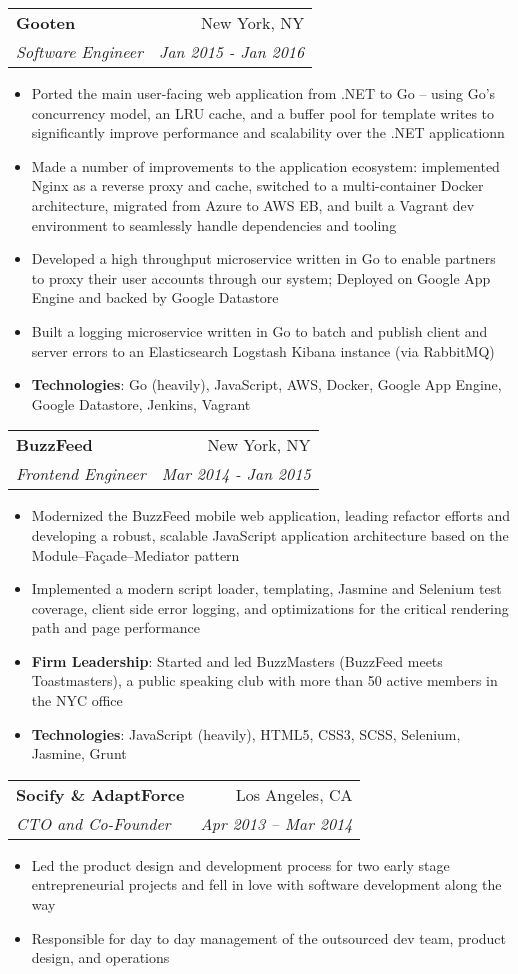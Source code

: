 \documentclass[letterpaper,11pt]{article}
\makeatletter
\newcommand{\resumeItem}[2]{
  \item\small{
    \textbf{#1}{: #2 \vspace{-2pt}}
  }
}
\newcommand{\resumeItemSimple}[1]{
  \item\small{
    {#1 \vspace{-2pt}}
  }
}
\newcommand{\resumeSubheading}[4]{
  \vspace{-1pt}\item
    \begin{tabular*}{0.97\textwidth}[t]{l@{\extracolsep{\fill}}r}
      \textbf{#1} & #2 \\
      \textit{\small#3} & \textit{\small #4} \\
    \end{tabular*}\vspace{-5pt}
}
\newcommand{\resumeItemListStart}{\begin{itemize}}
\newcommand{\resumeItemListEnd}{\end{itemize}\vspace{-5pt}}
\makeatother
\begin{document}
    \resumeSubheading
      {Gooten}{New York, NY}
      {Software Engineer}{Jan 2015 - Jan 2016}
      \resumeItemListStart
        \resumeItemSimple
          {Ported the main user-facing web application from .NET to Go -- using Go’s concurrency model, an LRU cache, and a buffer pool for template writes to significantly improve performance and scalability over the .NET applicationn}
        \resumeItemSimple
          {Made a number of improvements to the application ecosystem: implemented Nginx as a reverse proxy and cache, switched to a multi-container Docker architecture, migrated from Azure to AWS EB, and built a Vagrant dev environment to seamlessly handle dependencies and tooling}
        \resumeItemSimple
          {Developed a high throughput microservice written in Go to enable partners to proxy their user accounts through our system; Deployed on Google App Engine and backed by Google Datastore}
        \resumeItemSimple
          {Built a logging microservice written in Go to batch and publish client and server errors to an Elasticsearch Logstash Kibana instance (via RabbitMQ)}
        \resumeItem{Technologies}
        {Go (heavily), JavaScript, AWS, Docker, Google App Engine, Google Datastore, Jenkins, Vagrant}
      \resumeItemListEnd

    \resumeSubheading
      {BuzzFeed}{New York, NY}
      {Frontend Engineer}{Mar 2014 - Jan 2015}
      \resumeItemListStart
        \resumeItemSimple
          {Modernized the BuzzFeed mobile web application, leading refactor efforts and developing a robust, scalable JavaScript application architecture based on the Module–Fa\c cade–Mediator pattern}
        \resumeItemSimple
          {Implemented a modern script loader, templating, Jasmine and Selenium test coverage, client side error logging, and optimizations for the critical rendering path and page performance}
        \resumeItem{Firm Leadership}
          {Started and led BuzzMasters (BuzzFeed meets Toastmasters), a public speaking club with more than 50 active members in the NYC office}
        \resumeItem{Technologies}
        {JavaScript (heavily), HTML5, CSS3, SCSS, Selenium, Jasmine, Grunt}
      \resumeItemListEnd
      
    \resumeSubheading
      {Socify \& AdaptForce}{Los Angeles, CA}
      {CTO and Co-Founder}{Apr 2013 – Mar 2014}
      \resumeItemListStart
        \resumeItemSimple
          {Led the product design and development process for two early stage entrepreneurial projects and fell in love with software development along the way}
        \resumeItemSimple
          {Responsible for day to day management of the outsourced dev team, product design, and operations}
      \resumeItemListEnd
\end{document}
